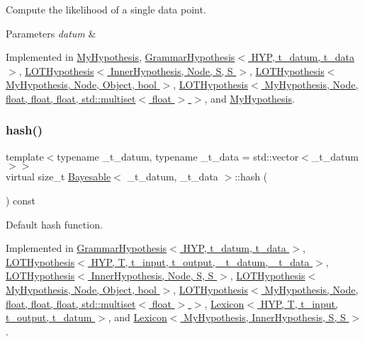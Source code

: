 Compute the likelihood of a single data point. 


\begin{DoxyParams}{Parameters}
{\em datum} & \\
\hline
\end{DoxyParams}


Implemented in \hyperlink{class_my_hypothesis_afcc759336d7f45f01b83807481a10f42}{My\+Hypothesis}, \hyperlink{class_grammar_hypothesis_a848ed67089c24b55cc61a4d84e350d05}{Grammar\+Hypothesis$<$ H\+Y\+P, t\+\_\+datum, t\+\_\+data $>$}, \hyperlink{class_l_o_t_hypothesis_aefea6d0e5d94b1fc716dedb9b25b7b26}{L\+O\+T\+Hypothesis$<$ Inner\+Hypothesis, Node, S, S $>$}, \hyperlink{class_l_o_t_hypothesis_aefea6d0e5d94b1fc716dedb9b25b7b26}{L\+O\+T\+Hypothesis$<$ My\+Hypothesis, Node, Object, bool $>$}, \hyperlink{class_l_o_t_hypothesis_aefea6d0e5d94b1fc716dedb9b25b7b26}{L\+O\+T\+Hypothesis$<$ My\+Hypothesis, Node, float, float, float, std\+::multiset$<$ float $>$ $>$}, and \hyperlink{class_my_hypothesis_a5e6bd5e0ebcb987aa4f0adf4295dba11}{My\+Hypothesis}.

\mbox{\label{class_bayesable_ab77a023d33951448e6edb2e1bc79c5ae}} 
\subsubsection{\texorpdfstring{hash()}{hash()}}
{\footnotesize\ttfamily template$<$typename \+\_\+t\+\_\+datum, typename \+\_\+t\+\_\+data = std\+::vector$<$\+\_\+t\+\_\+datum$>$$>$ \\
virtual size\+\_\+t \hyperlink{class_bayesable}{Bayesable}$<$ \+\_\+t\+\_\+datum, \+\_\+t\+\_\+data $>$\+::hash (\begin{DoxyParamCaption}{ }\end{DoxyParamCaption}) const\hspace{0.3cm}{\ttfamily [pure virtual]}}



Default hash function. 



Implemented in \hyperlink{class_grammar_hypothesis_a5b269a5ed433b94f6b2796f30a15fd9e}{Grammar\+Hypothesis$<$ H\+Y\+P, t\+\_\+datum, t\+\_\+data $>$}, \hyperlink{class_l_o_t_hypothesis_a8d269f6db62028468142df68ee225ea3}{L\+O\+T\+Hypothesis$<$ H\+Y\+P, T, t\+\_\+input, t\+\_\+output, \+\_\+t\+\_\+datum, \+\_\+t\+\_\+data $>$}, \hyperlink{class_l_o_t_hypothesis_a8d269f6db62028468142df68ee225ea3}{L\+O\+T\+Hypothesis$<$ Inner\+Hypothesis, Node, S, S $>$}, \hyperlink{class_l_o_t_hypothesis_a8d269f6db62028468142df68ee225ea3}{L\+O\+T\+Hypothesis$<$ My\+Hypothesis, Node, Object, bool $>$}, \hyperlink{class_l_o_t_hypothesis_a8d269f6db62028468142df68ee225ea3}{L\+O\+T\+Hypothesis$<$ My\+Hypothesis, Node, float, float, float, std\+::multiset$<$ float $>$ $>$}, \hyperlink{class_lexicon_a4fed68bd543c0be81dfd63a2c8d219bd}{Lexicon$<$ H\+Y\+P, T, t\+\_\+input, t\+\_\+output, t\+\_\+datum $>$}, and \hyperlink{class_lexicon_a4fed68bd543c0be81dfd63a2c8d219bd}{Lexicon$<$ My\+Hypothesis, Inner\+Hypothesis, S, S $>$}.

